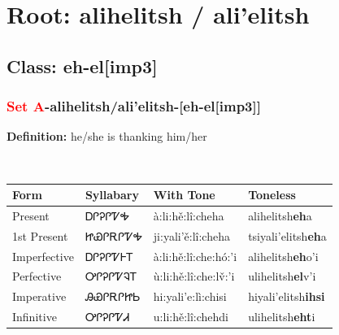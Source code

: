 \needspace{4in}
\section*{Root: alihelitsh / ali'elitsh}
\nopagebreak
{}
\needspace{3in}
\subsection*{Class: eh-el[imp3]}
\nopagebreak
\needspace{2in}
\subsubsection*{\textcolor{Red}{Set A}{-}\textbf{alihelitsh/ali'elitsh}{-}[eh-el[imp3]]}
\nopagebreak
\textbf{Definition: } he/she is thanking him/her
\\[0.5em]
\begin{tabularx}{\textwidth}{l X X X}%
\toprule%
\textbf{Form}&\textbf{Syllabary}&\textbf{With Tone}&\textbf{Toneless}\\%
\midrule%
Present&ᎠᎵᎮᎵᏤᎭ&à:li:hě:lî:cheha&alihelitsh\textbf{eh}a\\%
1st Present&ᏥᏯᎵᎡᎵᏤᎭ&ji:yali’ě:lî:cheha&tsiyali'elitsh\textbf{eh}a\\%
Imperfective&ᎠᎵᎮᎵᏤᎰᎢ&à:li:hě:lî:che:hó:’i&alihelitsh\textbf{eh}o'i\\%
Perfective&ᎤᎵᎮᎵᏤᎸᎢ&ù:li:hě:lî:che:lv̌:’i&ulihelitsh\textbf{el}v'i\\%
Imperative&ᎯᏯᎵᎡᎵᏥᏏ&hi:yali’e:lì:chisi&hiyali'elitsh\textbf{ihsi}\\%
Infinitive&ᎤᎵᎮᎵᏤᏗ&u:li:hě:lî:chehdi&ulihelitsh\textbf{eht}i\\%
\bottomrule%
\end{tabularx}
\\[1em]